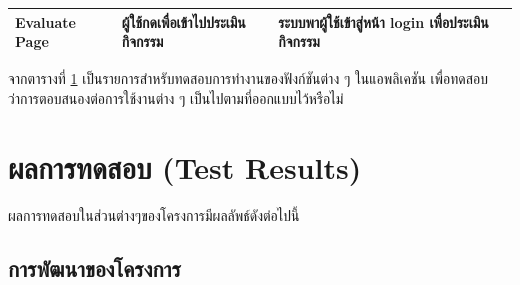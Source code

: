 \documentclass[14pt,oneside,openright,a4paper]{cpe-thai-project}
\begin{document}
\begin{table}[!h]
\begin{tabular}{|l|p{3cm}|p{5cm}|p{3cm}|}
  \hline
  Evaluate Page & ผู้ใช้กดเพื่อเข้าไปประเมินกิจกรรม & ระบบพาผู้ใช้เข้าสู่หน้า login เพื่อประเมินกิจกรรม & \\
  \hline
  \end{tabular}
  \label{tab:functionaltesting}
  จากตารางที่ \ref{tab:functionaltesting} เป็นรายการสำหรับทดสอบการทำงานของฟังก์ชันต่าง ๆ ในแอพลิเคชัน เพื่อทดสอบว่าการตอบสนองต่อการใช้งานต่าง ๆ เป็นไปตามที่ออกแบบไว้หรือไม่
\end{table}

\newpage
\section{ผลการทดสอบ (Test Results)}
ผลการทดสอบในส่วนต่างๆของโครงการมีผลลัพธ์ดังต่อไปนี้
\subsection{การพัฒนาของโครงการ}
\end{document}
